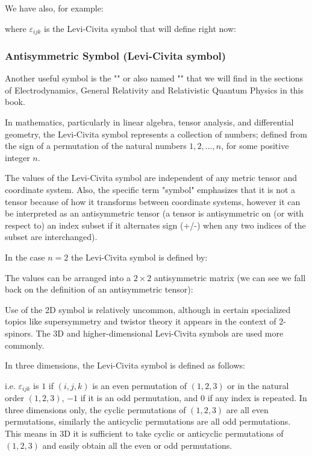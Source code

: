 	We have also, for example:
	
	where $\varepsilon_{ijk}$ is the Levi-Civita symbol that will define right now:
	
	\subsubsection{Antisymmetric Symbol (Levi-Civita symbol)}\label{levi civita symbol}
	Another useful symbol is the "" or also named "" that we will find in the sections of Electrodynamics,  General Relativity and Relativistic Quantum Physics in this book.
	
	In mathematics, particularly in linear algebra, tensor analysis, and differential geometry, the Levi-Civita symbol represents a collection of numbers; defined from the sign of a permutation of the natural numbers $1, 2, \ldots, n$, for some positive integer $n$.
	
		 The values of the Levi-Civita symbol are independent of any metric tensor and coordinate system. Also, the specific term "symbol" emphasizes that it is not a tensor because of how it transforms between coordinate systems, however it can be interpreted as an antisymmetric tensor (a tensor is antisymmetric on (or with respect to) an index subset if it alternates sign (+/-) when any two indices of the subset are interchanged).
	 
	 In the case $n=2$ the Levi-Civita symbol is defined by:
	 
	The values can be arranged into a $2\times 2$ antisymmetric matrix (we can see we fall back on the definition of an antisymmetric tensor):
	
	Use of the 2D symbol is relatively uncommon, although in certain specialized topics like supersymmetry and twistor theory it appears in the context of 2-spinors. The 3D and higher-dimensional Levi-Civita symbols are used more commonly.
	
	In three dimensions, the Levi-Civita symbol is defined as follows:
	
	i.e.  $\varepsilon_{ijk}$  is $1$ if $(i, j, k)$ is an even permutation of $(1,2,3)$ or in the natural order $(1,2,3)$, $-1$ if it is an odd permutation, and $0$ if any index is repeated. In three dimensions only, the cyclic permutations of $(1,2,3)$ are all even permutations, similarly the anticyclic permutations are all odd permutations. This means in 3D it is sufficient to take cyclic or anticyclic permutations of $(1,2,3)$ and easily obtain all the even or odd permutations.

